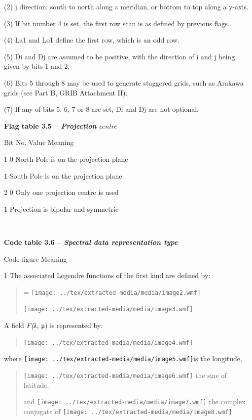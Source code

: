 (2) j direction: south to north along a meridian, or bottom to top along a y-axis.

(3) If bit number 4 is set, the first row scan is as defined by previous flags.

(4) La1 and Lo1 define the first row, which is an odd row.

(5) Di and Dj are assumed to be positive, with the direction of i and j being given by bits 1 and 2.

(6) Bits 5 through 8 may be used to generate staggered grids, such as Arakawa grids (see Part B, GRIB Attachment II).

(7) If any of bits 5, 6, 7 or 8 are set, Di and Dj are not optional.

\textbf{Flag table 3.5 -- \emph{Projection }}\emph{centre}

Bit No. Value Meaning

1 0 North Pole is on the projection plane

1 South Pole is on the projection plane

2 0 Only one projection centre is used

1 Projection is bipolar and symmetric

\textbf{\\
}

\textbf{Code table 3.6 -- \emph{Spectral data representation type}}

Code figure Meaning

1 The associated Legendre functions of the first kind are defined by:

\begin{quote}
= \texttt{[image: ../tex/extracted-media/media/image2.wmf]}

\texttt{[image: ../tex/extracted-media/media/image3.wmf]}
\end{quote}

A field \emph{F(λ,} μ) is represented by:

\begin{quote}
\texttt{[image: ../tex/extracted-media/media/image4.wmf]}
\end{quote}

where \texttt{[image: ../tex/extracted-media/media/image5.wmf]}is the longitude,

\begin{quote}
\texttt{[image: ../tex/extracted-media/media/image6.wmf]} the sine of latitude,

and \texttt{[image: ../tex/extracted-media/media/image7.wmf]} the complex conjugate of \texttt{[image: ../tex/extracted-media/media/image8.wmf]}
\end{quote}

